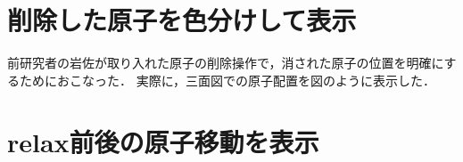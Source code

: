 
\section{削除した原子を色分けして表示}
前研究者の岩佐が取り入れた原子の削除操作で，消された原子の位置を明確にするためにおこなった．
実際に，三面図での原子配置を図のように表示した．

\section{relax前後の原子移動を表示}
